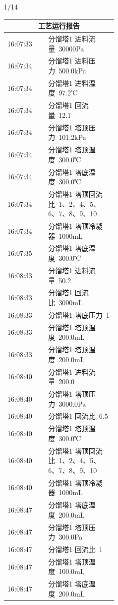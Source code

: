 \documentclass[UTF8,10pt,a4paper,fontset=fandol]{ctexart}
\newcommand{\handwritten}[1]{#1}
\begin{document}
\handwritten{1/14}

\newpage

\begin{center}
\scriptsize
\begin{tabular}{|p{0.12\linewidth}|p{0.32\linewidth}|}
\hline
\multicolumn{2}{c}{\textbf{工艺运行报告}}\\
\hline
16:07:33 & 分馏塔1 进料流量~30000Pa\\ \hline
16:07:34 & 分馏塔1 进料压力~500.0kPa\\ \hline
16:07:34 & 分馏塔1 进料温度~97.2℃\\ \hline
16:07:34 & 分馏塔1 回流量~12.1\\ \hline
16:07:34 & 分馏塔1 塔顶压力~101.2kPa\\ \hline
16:07:34 & 分馏塔1 塔顶温度~300.0℃\\ \hline
16:07:34 & 分馏塔1 塔底温度~300.0℃\\ \hline
16:07:34 & 分馏塔1 塔顶回流比~1、2、4、5、6、7、8、9、10\\ \hline
16:07:34 & 分馏塔1 塔顶冷凝器~1000mL\\ \hline
16:07:35 & 分馏塔1 塔底温度~300.0℃\\ \hline
16:08:33 & 分馏塔1 进料流量~50.2\\ \hline
16:08:33 & 分馏塔1 回流比~3000mL\\ \hline
16:08:33 & 分馏塔1 塔底压力~1\\ \hline
16:08:33 & 分馏塔1 塔顶温度~200.0mL\\ \hline
16:08:33 & 分馏塔1 塔顶温度~200.0mL\\ \hline
16:08:40 & 分馏塔1 进料流量~200.0\\ \hline
16:08:40 & 分馏塔1 塔顶压力~3000.0Pa\\ \hline
16:08:40 & 分馏塔1 回流比~6.5\\ \hline
16:08:40 & 分馏塔1 塔顶温度~300.0℃\\ \hline
16:08:40 & 分馏塔1 塔顶回流比~1、2、4、5、6、7、8、9、10\\ \hline
16:08:40 & 分馏塔1 塔顶冷凝器~1000mL\\ \hline
16:08:47 & 分馏塔1 塔底温度~200.0mL\\ \hline
16:08:47 & 分馏塔1 塔顶压力~300.0Pa\\ \hline
16:08:47 & 分馏塔1 回流比~1\\ \hline
16:08:47 & 分馏塔1 塔顶温度~100.0mL\\ \hline
16:08:47 & 分馏塔1 塔底温度~200.0mL\\ \hline

\end{tabular}
\end{center}
\end{document}
